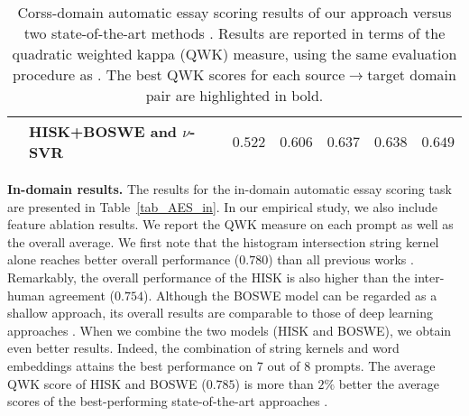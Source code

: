 \documentclass[11pt,a4paper]{article}
\begin{document}
\begin{table*}[!t]
\begin{center}
\begin{tabular}{clccccc}
											& HISK+BOSWE and $\nu$-SVR						& $\mathbf{0.522}$ 	& $\mathbf{0.606}$ 				
																				& $\mathbf{0.637}$ 	& $\mathbf{0.638}$	& $\mathbf{0.649}$\\
\hline
\end{tabular}
\end{center}
\vspace*{-0.2cm}
\caption{Corss-domain automatic essay scoring results of our approach versus two state-of-the-art methods \cite{Phandi-EMNLP-2015,Dong-EMNLP-2016}. Results are reported in terms of the quadratic weighted kappa (QWK) measure, using the same evaluation procedure as \cite{Phandi-EMNLP-2015,Dong-EMNLP-2016}. The best QWK scores for each source$\rightarrow$target domain pair are highlighted in bold.}
\label{tab_AES_cross}
\vspace*{-0.3cm}
\end{table*}

\noindent
{\bf In-domain results.}
The results for the in-domain automatic essay scoring task are presented in Table~\ref{tab_AES_in}. In our empirical study, we also include feature ablation results. We report the QWK measure on each prompt as well as the overall average. We first note that the histogram intersection string kernel alone reaches better overall performance ($0.780$) than all previous works \cite{Phandi-EMNLP-2015,Dong-EMNLP-2016,Dong-CONLL-2017,Tay-ACL-2018}. Remarkably, the overall performance of the HISK is also higher than the inter-human agreement ($0.754$). Although the BOSWE model can be regarded as a shallow approach, its overall results are comparable to those of deep learning approaches \cite{Dong-EMNLP-2016,Dong-CONLL-2017,Tay-ACL-2018}. When we combine the two models (HISK and BOSWE), we obtain even better results. Indeed, the combination of string kernels and word embeddings attains the best performance on 7 out of 8 prompts. The average QWK score of HISK and BOSWE ($0.785$) is more than $2\%$ better the average scores of the best-performing state-of-the-art approaches \cite{Dong-CONLL-2017,Tay-ACL-2018}.
\end{document}
